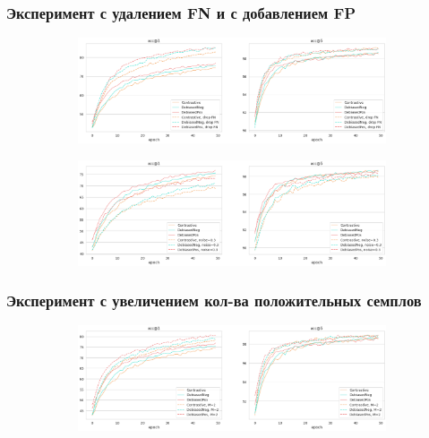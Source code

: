 \documentclass[
	11pt, %
]{beamer}
\begin{document}
\begin{frame}
	\frametitle{Эксперимент с удалением FN и с добавлением FP}
\begin{figure}
\centering
\begin{subfigure}
  \centering
  \includegraphics[width=0.95\linewidth]{Images/base_vs_dropfn.png}
  \label{fig:sub1}
\end{subfigure}%
\begin{subfigure}
  \centering
  \includegraphics[width=0.95\linewidth]{Images/base_vs_noise.png}
  \label{fig:sub2}
\end{subfigure}
\label{fig:test}
\end{figure}
	
\end{frame}

\begin{frame}
	\frametitle{Эксперимент с увеличением кол-ва положительных семплов}
\begin{figure}
\centering
\begin{subfigure}
  \centering
  \includegraphics[width=1\linewidth]{Images/base_vs_M=2.png}
  \label{fig:sub1}
\end{subfigure}
\label{fig:test}
\end{figure}
	
\end{frame}
\end{document}

